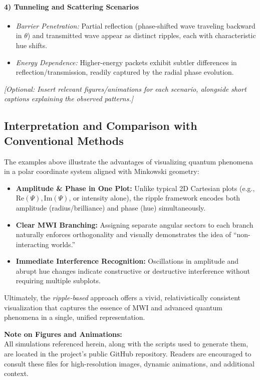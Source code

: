 \documentclass{article}
\begin{document}
\paragraph{4) Tunneling and Scattering Scenarios}
\begin{itemize}
    \item \textit{Barrier Penetration:} Partial reflection (phase-shifted wave traveling backward in \(\theta\)) and transmitted wave appear as distinct ripples, each with characteristic hue shifts.
    \item \textit{Energy Dependence:} Higher-energy packets exhibit subtler differences in reflection/transmission, readily captured by the radial phase evolution.
\end{itemize}

\noindent
\textit{[Optional: Insert relevant figures/animations for each scenario, alongside short captions explaining the observed patterns.]}


\subsection{Interpretation and Comparison with Conventional Methods}
The examples above illustrate the advantages of visualizing quantum phenomena in a polar coordinate system aligned with Minkowski geometry:
\begin{itemize}
    \item \textbf{Amplitude \& Phase in One Plot:} Unlike typical 2D Cartesian plots (e.g., \(\mathrm{Re}(\Psi), \mathrm{Im}(\Psi)\), or intensity alone), the ripple framework encodes both amplitude (radius/brilliance) and phase (hue) simultaneously.
    \item \textbf{Clear MWI Branching:} Assigning separate angular sectors to each branch naturally enforces orthogonality and visually demonstrates the idea of “non-interacting worlds.”
    \item \textbf{Immediate Interference Recognition:} Oscillations in amplitude and abrupt hue changes indicate constructive or destructive interference without requiring multiple subplots.
\end{itemize}

\noindent Ultimately, the \emph{ripple-based} approach offers a vivid, relativistically consistent visualization that captures the essence of MWI and advanced quantum phenomena in a single, unified representation.

\bigskip
\noindent
\textbf{Note on Figures and Animations:}\\
All simulations referenced herein, along with the scripts used to generate them, are located in the project’s public GitHub repository. Readers are encouraged to consult these files for high-resolution images, dynamic animations, and additional context.
\end{document}
